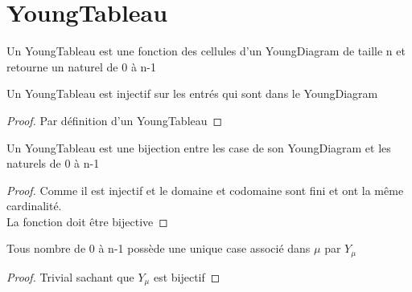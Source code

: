 \chapter{YoungTableau}

\begin{definition}[YoungTableau]
    \label{YoungTableau}
    \leanok
    Un YoungTableau est une fonction des cellules d'un YoungDiagram de taille n et retourne un naturel de 0 à n-1
\end{definition}

\begin{lemma}[injYu]
    \label{injYu}
    \leanok
    Un YoungTableau est injectif sur les entrés qui sont dans le YoungDiagram
\end{lemma}
\begin{proof}
    \leanok
    Par définition d'un YoungTableau
\end{proof}

\begin{lemma}[bijYu]
    \label{bijYu}
    \leanok
    Un YoungTableau est une bijection entre les case de son YoungDiagram et les naturels de 0 à n-1
\end{lemma}
\begin{proof}
    \leanok
    Comme il est injectif et le domaine et codomaine sont fini et ont la même cardinalité.\\
    La fonction doit être bijective
\end{proof}

\begin{lemma}[preImYu]
    \label{preImYu}
    \leanok
    Tous nombre de 0 à n-1 possède une unique case associé dans $\mu$ par $Y_{\mu}$
\end{lemma}
\begin{proof}
    \leanok
    Trivial sachant que $Y_{\mu}$ est bijectif
\end{proof}

